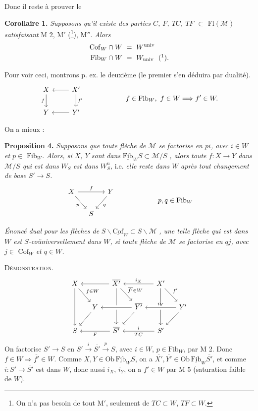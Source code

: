 \documentclass[11pt]{article}
\newcommand{\printedpage}[1]{\marginpar{\footnotesize p.~#1}}
\newcommand{\msp}[1]{\marginpar{\footnotesize [#1]}}
\newcommand{\cM}{\mathcal{M}}
\newcommand{\Fl}{\mathrm{Fl}}
\newcommand{\Cof}{\mathrm{Cof}}
\newcommand{\Fib}{\mathrm{Fib}}
\newcommand{\Ob}{\mathrm{Ob}}
\begin{document}
\msp{page 10}Donc il reste à prouver le

\textbf{Corollaire 1.} \textit{Supposons qu'il existe des parties $C$, $F$, $TC$, $TF$ $\subset$} $\Fl(\cM)$ \textit{satisfaisant} M 2, M$'$ (\footnote{On n'a pas besoin de tout M$'$, seulement de $TC\subset W$, $TF\subset W$.}), M$''$. \textit{Alors}
\[
\begin{aligned}
\Cof_W\cap W\ &=\ W^{\mathrm{univ}}\\
\Fib_W\cap W\ &=\ W_{\mathrm{univ}}\ \ (\mbox{\footnotemark}).
\end{aligned}
\]

Pour voir ceci, montrons p. ex. le deuxième (le premier s'en déduira par dualité).
\[
\begin{tikzcd}
X \ar[d,"f"'] & X' \ar[l] \ar[d,"f'"] \\
Y & Y' \ar[l]
\end{tikzcd}
\qquad\qquad\qquad
f\in\Fib_W,\ f\in W\Longrightarrow f'\in W.
\]

\printedpage{7}
On a mieux :

\textbf{Proposition 4.} \textit{Supposons que toute flèche de $\cM$ se factorise en $pi$, avec $i\in W$ et $p\in$} $\Fib_W$\textit{. Alors, si $X$, $Y$ sont dans} $\underline{\Fib}_W S\subset\cM/S$ \textit{, alors toute $f:X\longrightarrow Y$ dans $\cM/S$ qui est dans} $W_S$ \textit{est dans $W^{\mathrm{u}}_S$,} i.e. \textit{elle reste dans $W$ après tout changement de base $S'\longrightarrow S$.}
\[
\begin{tikzcd}[column sep=small]
X \ar[rr,"f"] \ar[dr,"p"'] & & Y \ar[dl,"q"] \\
& S &
\end{tikzcd}
\qquad\qquad\qquad
p,q\in\Fib_W
\]

\textit{Énoncé dual pour les flèches de} $S\backslash\underline{\Cof}_W\subset S\backslash\cM$ \textit{, une telle flèche qui est dans $W$ est $S$-coüniversellement dans $W$, si toute flèche de $\cM$ se factorise en $qj$, avec $j\in$} $\Cof_W$ \textit{et $q\in W$.}

\msp{page 11}\textsc{Démonstration}.
\[
\begin{tikzcd}[column sep=small]
X \ar[dr,"f\in W"] \ar[dd] & & \overline{X'} \ar[ll] \ar[dr,"\overline{f'}\in W"] \ar[dd] & & X' \ar[ll,"i_X"'] \ar[dr,"f'"] \ar[dd] & \\
& Y \ar[dl] & & \overline{Y'} \ar[ll,crossing over] \ar[dl] & & Y' \ar[ll,"i_Y"',crossing over] \ar[dl] \\
S & & \overline{S'} \ar[ll,"F"] & & S' \ar[ll,"i"',"TC"] &
\end{tikzcd}
\]
On factorise $S'\longrightarrow S$ en $S'\overset{i}{\longrightarrow}\overline{S'}\overset{p}{\longrightarrow}S$, avec $i\in W$, $p\in\Fib_W$, par M 2. Donc $f\in W\Longrightarrow\overline{f'}\in W$. Comme $X,Y\in\Ob\,\underline{\Fib}_W S$, on a $\overline{X'},\overline{Y'}\in\Ob\,\underline{\Fib}_W\overline{S'}$, et comme $i:S'\longrightarrow\overline{S'}$ est dans $W$, donc aussi $i_X$, $i_Y$, on a $f'\in W$ par M 5 (saturation faible de $W$).
\end{document}
